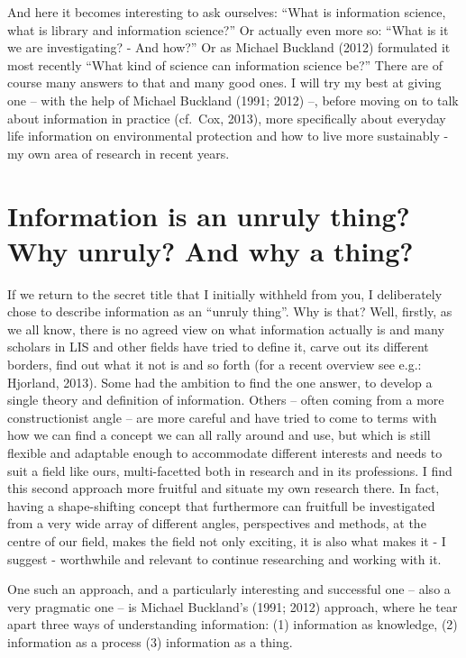 \documentclass[a4paper,
fontsize=11pt,
oneside,
numbers=noperiodatend,
parskip=half-,
bibliography=totoc,
final
]{scrartcl}
\begin{document}
And here it becomes interesting to ask ourselves: \enquote{What is
information science, what is library and information science?} Or
actually even more so: \enquote{What is it we are investigating? - And
how?} Or as Michael Buckland (2012) formulated it most recently
\enquote{What kind of science can information science be?} There are of
course many answers to that and many good ones. I will try my best at
giving one -- with the help of Michael Buckland (1991; 2012) --, before
moving on to talk about information in practice (cf.~Cox, 2013), more
specifically about everyday life information on environmental protection
and how to live more sustainably - my own area of research in recent
years.

\section*{Information is an unruly thing? Why unruly? And why a
thing?}\label{information-is-an-unruly-thing-why-unruly-and-why-a-thing}

If we return to the secret title that I initially withheld from you, I
deliberately chose to describe information as an \enquote{unruly thing}.
Why is that? Well, firstly, as we all know, there is no agreed view on
what information actually is and many scholars in LIS and other fields
have tried to define it, carve out its different borders, find out what
it not is and so forth (for a recent overview see e.g.: Hjorland, 2013).
Some had the ambition to find the one answer, to develop a single theory
and definition of information. Others -- often coming from a more
constructionist angle -- are more careful and have tried to come to
terms with how we can find a concept we can all rally around and use,
but which is still flexible and adaptable enough to accommodate
different interests and needs to suit a field like ours, multi-facetted
both in research and in its professions. I find this second approach
more fruitful and situate my own research there. In fact, having a
shape-shifting concept that furthermore can fruitfull be investigated
from a very wide array of different angles, perspectives and methods, at
the centre of our field, makes the field not only exciting, it is also
what makes it - I suggest - worthwhile and relevant to continue
researching and working with it.

One such an approach, and a particularly interesting and successful one
-- also a very pragmatic one -- is Michael Buckland's (1991; 2012)
approach, where he tear apart three ways of understanding information:
(1) information as knowledge, (2) information as a process (3)
information as a thing.
\end{document}
